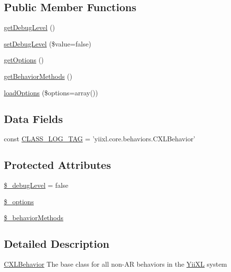 \subsection*{Public Member Functions}
\begin{DoxyCompactItemize}
\item 
\hyperlink{classCXLBehavior_a122db96cedfc221cf187ce4328f992f7}{getDebugLevel} ()
\item 
\hyperlink{classCXLBehavior_a91ba7d911e2c3852a048f4022c45ec9e}{setDebugLevel} (\$value=false)
\item 
\hyperlink{classCXLBehavior_a1a49b8dded6e91a52e2fd07195d334da}{getOptions} ()
\item 
\hyperlink{classCXLBehavior_a50138660370da467322f8f3965008b14}{getBehaviorMethods} ()
\item 
\hyperlink{classCXLBehavior_ad51d235c20d44a485f9f00f2c86a5ea9}{loadOptions} (\$options=array())
\end{DoxyCompactItemize}
\subsection*{Data Fields}
\begin{DoxyCompactItemize}
\item 
const \hyperlink{classCXLBehavior_aa607ab5e557e6ebb60b85c5a20ad067f}{CLASS\_\-LOG\_\-TAG} = 'yiixl.core.behaviors.CXLBehavior'
\end{DoxyCompactItemize}
\subsection*{Protected Attributes}
\begin{DoxyCompactItemize}
\item 
\hyperlink{classCXLBehavior_aa658930951c1fb5a0640c326c54297c1}{\$\_\-debugLevel} = false
\item 
\hyperlink{classCXLBehavior_ab0cd304a53a2640dc4f15e8d6100612f}{\$\_\-options}
\item 
\hyperlink{classCXLBehavior_a7d3b71fe5a778aaf10f9d65f7717c439}{\$\_\-behaviorMethods}
\end{DoxyCompactItemize}


\subsection{Detailed Description}
\hyperlink{classCXLBehavior}{CXLBehavior} The base class for all non-\/AR behaviors in the \hyperlink{classYiiXL}{YiiXL} system 

